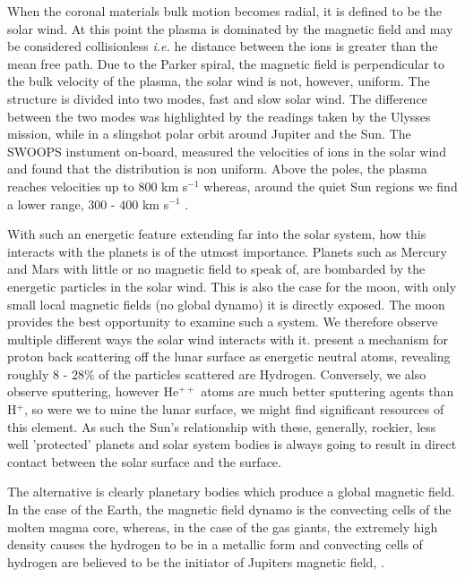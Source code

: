When the coronal materials bulk motion becomes radial, it is defined to be the solar wind.
At this point the plasma is dominated by the magnetic field and may be considered collisionless \emph{i.e.} he distance between the ions is greater than the mean free path.
Due to the Parker spiral, \cite{Forsyth2013} the magnetic field is perpendicular to the bulk velocity of the plasma, the solar wind is not, however, uniform.
The structure is divided into two modes, fast and slow solar wind. 
The difference between the two modes was highlighted by the readings taken by the Ulysses mission, while in a slingshot polar orbit around Jupiter and the Sun.
The SWOOPS instument on-board, measured the velocities of ions in the solar wind and found that the distribution is non uniform.
Above the poles, the plasma reaches velocities up to $800$ km s${^{-1}}$ whereas, around the quiet Sun regions we find a lower range, $300$ - $400$ km s${^{-1}}$ \cite{McComas2003}.

With such an energetic feature extending far into the solar system, how this interacts with the planets is of the utmost importance.
Planets such as Mercury and Mars with little or no magnetic field to speak of, are bombarded by the energetic particles in the solar wind.
This is also the case for the moon, with only small local magnetic fields (no global dynamo) it is directly exposed.
The moon provides the best opportunity to examine such a system. 
We therefore observe multiple different ways the solar wind interacts with it.
\cite{Bhardwaj2015} present a mechanism for proton back scattering off the lunar surface as energetic neutral atoms, revealing roughly $8$ - $28\%$ of the particles scattered are Hydrogen.
Conversely, we also observe sputtering, however He$^{++}$ atoms are much better sputtering agents than H$^{+}$, so were we to mine the lunar surface, we might find significant resources of this element. 
As such the Sun's relationship with these, generally, rockier, less well 'protected' planets and solar system bodies is always going to result in direct contact between the solar surface and the surface.

The alternative is clearly planetary bodies which produce a global magnetic field.
In the case of the Earth, the magnetic field dynamo is the convecting cells of the molten magma core, whereas, in the case of the gas giants, the extremely high density causes the hydrogen to be in a metallic form and convecting cells of hydrogen are believed to be the initiator of Jupiters magnetic field, \cite{Kutner2003}.

